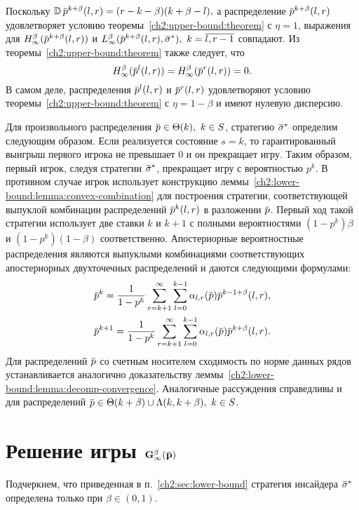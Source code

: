 {Поскольку
$
  \D \p^{k+\beta}(l, r) = (r-k-\beta)(k+\beta-l),
$
а распределение $\p^{k+\beta}(l, r)$ удовлетворяет условию теоремы~\ref{ch2:upper-bound:theorem} с $\eta = 1$, выражения для $\High[\infty](\p^{k+\beta}(l, r))$ и $\Low[\infty](\p^{k+\beta}(l, r), \sigmav^*),\ k = \overline{l,r-1}$ совпадают.
Из теоремы~\ref{ch2:upper-bound:theorem} также следует, что
\begin{equation*}
  \High[\infty](\p^l(l,r)) = \High[\infty](\p^r(l,r)) = 0.
\end{equation*}
В самом деле, распределения $\p^l(l,r)$ и $\p^r(l,r)$ удовлетворяют условию теоремы~\ref{ch2:upper-bound:theorem} с $\eta = 1-\beta$ и имеют нулевую дисперсию.

Для произвольного распределения $\p \in \Theta(k),\ k \in S$, стратегию $\sigmav^*$ определим следующим образом.
Если реализуется состояние $s = k$, то гарантированный выигрыш первого игрока не превышает $0$ и он прекращает игру.
Таким образом, первый игрок, следуя стратегии $\sigmav^*$, прекращает игру с вероятностью $p^k$.
В противном случае игрок использует конструкцию леммы~\ref{ch2:lower-bound:lemma:convex-combination} для построения стратегии, соответствующей выпуклой комбинации распределений $\p^k(l, r)$ в разложении $\p$.
Первый ход такой стратегии использует две ставки $k$ и $k+1$ с полными вероятностями $(1-p^k)\beta$ и $(1-p^k)(1-\beta)$ соответственно.
Апостериорные вероятностные распределения являются выпуклыми комбинациями соответствующих апостериорных двухточечных распределений и даются следующими формулами:
\begin{gather*}
  \p^k = \frac{1}{1-p^k} \sum_{r=k+1}^\infty \sum_{l=0}^{k-1} \alpha_{l,r}(\p) \p^{k-1+\beta}(l, r), \\
  \p^{k+1} = \frac{1}{1-p^k} \sum_{r=k+1}^\infty \sum_{l=0}^{k-1} \alpha_{l,r}(\p) \p^{k+\beta}(l, r).
\end{gather*}
Для распределений $\p$ со счетным носителем сходимость по норме данных рядов устанавливается аналогично доказательству леммы~\ref{ch2:lower-bound:lemma:decomp-convergence}.
Аналогичные рассуждения справедливы и для распределений $\p \in \Theta(k+\beta) \cup \Lambda(k, k+\beta),\ k \in S$.

\section{Решение игры $\mathbf{G^\beta_\infty(\p)}$}
\label{ch2:sec:game-solution}

Подчеркнем, что приведенная в п.~\ref{ch2:sec:lower-bound} стратегия инсайдера $\sigmav^*$ определена только при $\beta \in (0, 1)$.

}
